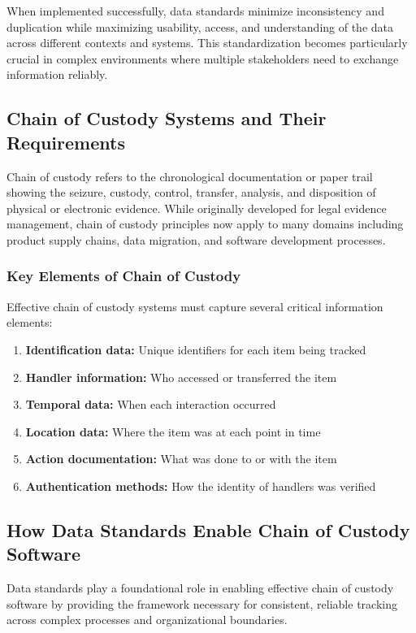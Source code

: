 \documentclass[title=small,preset=opensansnote,par=skip]{article}
\begin{document}
When implemented successfully, data standards minimize inconsistency and duplication while maximizing usability, access, and understanding of the data across different contexts and systems. This standardization becomes particularly crucial in complex environments where multiple stakeholders need to exchange information reliably.
\subsection{Chain of Custody Systems and Their Requirements}
\label{sec:orga69354d}

Chain of custody refers to the chronological documentation or paper trail showing the seizure, custody, control, transfer, analysis, and disposition of physical or electronic evidence. While originally developed for legal evidence management, chain of custody principles now apply to many domains including product supply chains, data migration, and software development processes.
\subsubsection{Key Elements of Chain of Custody}
\label{sec:orga9ff68c}

Effective chain of custody systems must capture several critical information elements:

\begin{enumerate}
\item \textbf{Identification data:} Unique identifiers for each item being tracked
\item \textbf{Handler information:} Who accessed or transferred the item
\item \textbf{Temporal data:}  When each interaction occurred
\item \textbf{Location data:} Where the item was at each point in time
\item \textbf{Action documentation:} What was done to or with the item
\item \textbf{Authentication methods:} How the identity of handlers was verified
\end{enumerate}
\subsection{How Data Standards Enable Chain of Custody Software}
\label{sec:org4160615}

Data standards play a foundational role in enabling effective chain of custody software by providing the framework necessary for consistent, reliable tracking across complex processes and organizational boundaries.
\end{document}
